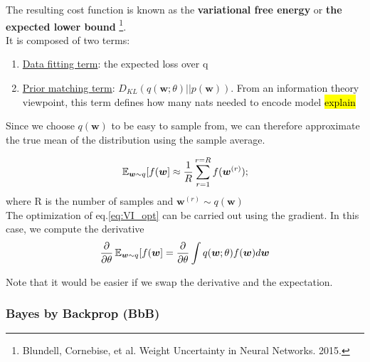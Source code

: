 \documentclass[main]{subfiles}
\begin{document}
\noindent The resulting cost function is known as the \textbf{variational free energy} or \textbf{the expected lower bound} \footnote{Blundell, Cornebise, et al. Weight Uncertainty in Neural Networks. 2015.}. \\It is composed of two terms:
\begin{enumerate}
    \item \underline{Data fitting term}: the expected loss over q
    \item \underline{Prior matching term}: $D_{KL}(q(\bm{w}; \theta)||p(\bm{w}))$. From an information theory viewpoint, this term defines how many nats needed to encode model \hl{explain}
\end{enumerate}

Since we choose $q(\bm{w})$ to be easy to sample from, we can therefore approximate the true mean of the distribution using the sample average.

\begin{equation}
    \operatorname{\mathbb{E}}_{\bm{w} \sim q} [f(\bm{w}] \approx \frac{1}{R} \sum_{r=1}^{r=R} f(\bm{w}^{(r)});
\end{equation}
where R is the number of samples and $\bm{w}^{(r)} \sim q(\bm{w})$\\

\noindent
The optimization of eq.\ref{eq:VI_opt} can be carried out using the gradient. In this case, we compute the derivative
\begin{equation}
    \frac{\partial}{\partial \theta} \operatorname{\mathbb{E}}_{\bm{w} \sim q} [f(\bm{w}] = \frac{\partial}{\partial \theta} \int q(\bm{w};\theta) f(\bm{w}) d\bm{w}
\end{equation}

Note that it would be easier if we swap the derivative and the expectation. 

\subsubsection{Bayes by Backprop (BbB)}
\end{document}

